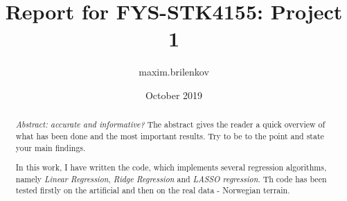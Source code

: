 \documentclass[paper=a4, fontsize=12pt, svgnames]{scrartcl}
\title{Report for FYS-STK4155: Project 1}
\author{maxim.brilenkov }
\date{October 2019}
\begin{document}



\maketitle

\begin{abstract}
    \textit{Abstract: accurate and informative? }
    The abstract gives the reader a quick overview of what has been done and the most important results. Try to be to the point and state your main findings.
    
    In this work, I have written the code, which implements several regression algorithms, namely \textit{Linear Regression}, \textit{Ridge Regression} and \textit{LASSO regression}. Th code has been tested firstly on the artificial and then on the real data - Norwegian terrain.
\end{abstract}












\end{document}
